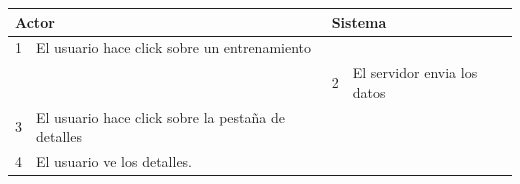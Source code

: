 \begin{itemize}
\begin{itemize}
\begin{table}[H]
\begin{tabularx}{\textwidth}{|l|X|l|X|}
        \multicolumn{2}{|l|}{\cellcolor[HTML]{EFEFEF}Actor} & \multicolumn{2}{l|}{\cellcolor[HTML]{EFEFEF}Sistema} \\ \hline
        1                         & El usuario hace click sobre un entrenamiento                       &                            &                         \\ \hline
                                  &                         & 2                          & El servidor envia los datos                     \\ \hline
        3                        & El usuario hace click sobre la pestaña de detalles      &                          &                        \\ \hline
        4                        & El usuario ve los detalles.      &                          &                        \\ \hline
                                  

\end{tabularx}
\end{table}
\end{itemize}
\end{itemize}
